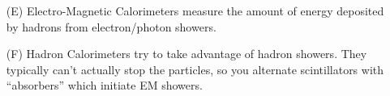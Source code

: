\documentclass[a4paper,twoside,master.tex]{subfiles}
\begin{document}
\begin{itemize}
    \item[(E)] Electro-Magnetic Calorimeters measure the amount of energy deposited by hadrons from electron/photon showers.
    \item[(F)] Hadron Calorimeters try to take advantage of hadron showers. They typically can't actually stop the particles, so you alternate scintillators with ``absorbers'' which initiate EM showers.
\end{itemize}
\end{document}
